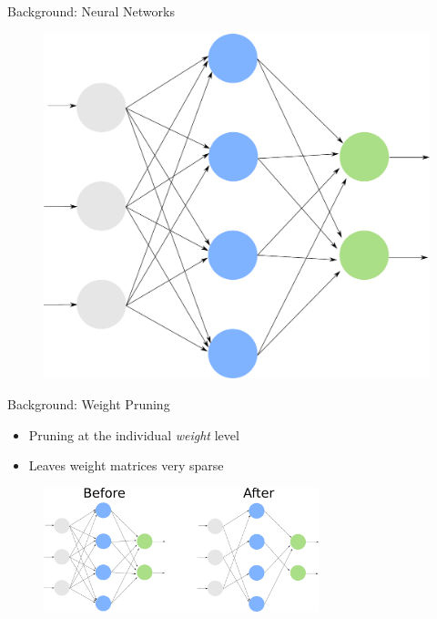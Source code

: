 \documentclass{beamer}
\begin{document}
\begin{frame}{Background: Neural Networks}

\begin{figure}
    \centering
    \includegraphics[width=0.6\linewidth]{images/neural_network.pdf}
\end{figure}
\end{frame}



\begin{frame}{Background: Weight Pruning}

\begin{itemize}
    \item Pruning at the individual \textit{weight} level
    \item Leaves weight matrices very sparse
\end{itemize}

\begin{figure}
    \centering
    \includegraphics[width=8cm]{images/weight_pruning.pdf}
\end{figure}

\end{frame}
\end{document}
